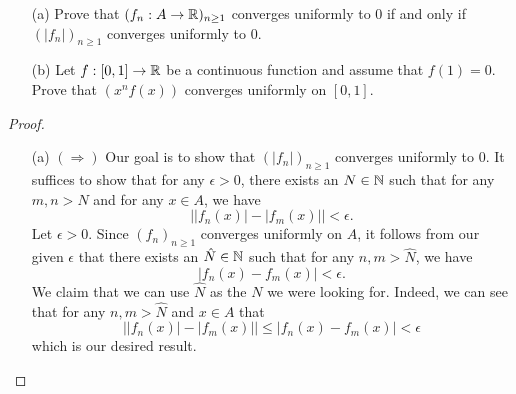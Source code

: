 \documentclass[a4paper]{article}
\begin{document}
\begin{problem}
    \begin{enumerate}
        \item[(a)] Prove that \( ({f}_{n}: A \to \mathbb{R} )_{n \geq 1} \) converges uniformly to \( 0  \) if and only if \( (| {f}_{n} | )_{n \geq1} \) converges uniformly to 0.
        \item[(b)] Let \( f: [0,1] \to \mathbb{R}  \) be a continuous function and assume that \( f(1) = 0  \). Prove that \( (x^{n} f(x))  \) converges uniformly on \( [0,1] \).
    \end{enumerate}
\end{problem}
\begin{proof}
\begin{enumerate}
    \item[(a)] \( (\Longrightarrow) \) Our goal is to show that \( (| {f}_{n} | )_{n \geq 1}  \) converges uniformly to \( 0  \). It suffices to show that for any \( \epsilon > 0  \), there exists an \( N \in \mathbb{N} \) such that for any \( m,n > N  \) and for any \( x \in A  \), we have  
        \[  \big| | {f}_{n}(x) | - | {f}_{m}(x)  |   \big| < \epsilon. \]
        Let \( \epsilon > 0  \). Since \( ({f}_{n})_{n \geq1}  \) converges uniformly on \( A  \), it follows from our given \( \epsilon   \) that there exists an \( \hat{N} \in \mathbb{N} \) such that for any \( n,m > \hat{N} \), we have  
        \[  | {f}_{n}(x) - {f}_{m}(x) | < \epsilon. \]
        We claim that we can use \( \hat{N} \) as the \( N  \) we were looking for. Indeed, we can see that for any \( n,m > \hat{N} \) and \( x \in A  \) that 
        \[ \big| | {f}_{n}(x) | - | {f}_{m}(x) |  \big| \leq | {f}_{n}(x) - {f}_{m}(x) | < \epsilon  \]
       which is our desired result. 


\end{enumerate}
\end{proof}
\end{document}
